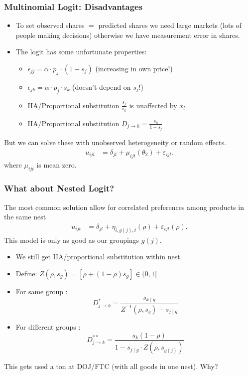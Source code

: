 \begin{frame}
\frametitle{Multinomial Logit: Disadvantages}
\begin{itemize}
\item To set \alert{observed shares} $=$ \alert{predicted shares} we need \alert{large markets} (lots of people making decisions) otherwise we have \alert{measurement error} in shares.
\item The logit has some unfortunate properties:
\begin{itemize}
    \item $\epsilon_{jj} = \alpha \cdot p_j \cdot (1-s_j)$ (increasing in own price!)
    \item $\epsilon_{jk} = \alpha \cdot p_j \cdot s_k $ (doesn't depend on $s_j$!)
    \item IIA/Proportional substitution $\frac{s_j}{s_k}$ is unaffected by $x_{l}$
    \item IIA/Proportional substitution $D_{j \rightarrow k} = \frac{s_k}{1-s_j}$
\end{itemize}
\end{itemize}
\pause
But we can solve these with \alert{unobserved heterogeneity} or \alert{random effects}.
\begin{align*}
u_{ijt} &= \delta_{jt} +\mu_{ijt}(\theta_2) +  \varepsilon_{ijt}. 
\end{align*}
where $\mu_{ijt}$ is mean zero.
\end{frame}



\begin{frame}
\frametitle{What about Nested Logit?}
The most common solution allow for correlated preferences among products in the same nest
\begin{align*}
u_{ijt} &= \delta_{jt} +\eta_{i,g(j),t}(\rho) +  \varepsilon_{ijt}(\rho). 
\end{align*}
This model is only as good as our groupings $g(j)$.
\begin{itemize}
    \item We still get IIA/proportional substitution \alert{within nest}.
    \item Define: $Z\left(\rho, s_g\right)=\left[\rho+(1-\rho) s_g\right] \in(0,1]$
    \item For same group : $$ D_{j \rightarrow k}^*=\frac{s_{k \mid g}}{Z^{-1}\left(\rho, s_g\right)-s_{j \mid g}} $$
    \item For different groups : $$ D_{j \rightarrow k}^{**}=\frac{s_k(1-\rho)}{1-s_{j \mid g} \cdot Z\left(\rho, s_{g(j)}\right)} $$
\end{itemize}
This gets used a ton at DOJ/FTC (with all goods in one nest). Why?\\
\end{frame}


